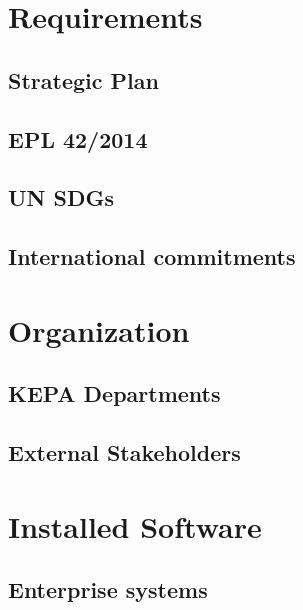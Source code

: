 \documentclass[12pt,a4paper]{report}
\begin{document}
\begin{linenumbers} %
\end{linenumbers} %

	\tableofcontents
	\listoftables
	\listoffigures

\pagestyle{fancy}
\fancyhf{}
\begin{linenumbers} %

\chapter{Requirements} 
\section{Strategic Plan}
\section{EPL 42/2014}
\section{UN SDGs}
\section{International commitments}

\chapter{Organization}
\section{KEPA Departments}
\section{External Stakeholders}

\chapter{Installed Software}
\section{Enterprise systems}

\end{linenumbers}
\end{document}
